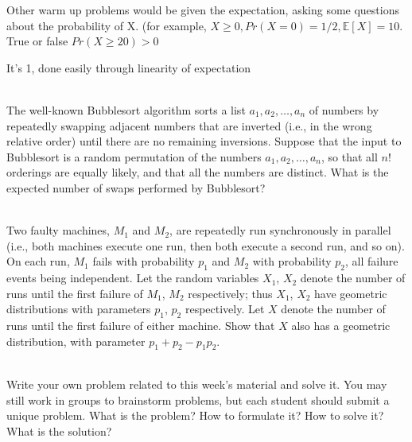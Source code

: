 \documentclass[]{article}
\begin{document}
\begin{qunlist}
 Other warm up problems would be given the expectation, asking some questions about the probability of X. (for example, $X\geq 0, Pr(X=0) = 1/2, \mathbb{E}[X] = 10.$ True or false $Pr(X \geq 20) > 0$



It's 1, done easily through linearity of expectation


 \\
The well-known Bubblesort algorithm sorts a list $a_1, a_2, \ldots, a_n$ of numbers by repeatedly swapping adjacent numbers that are inverted (i.e., in the wrong relative order) until there are no remaining inversions. Suppose that the input to Bubblesort is a random permutation of the numbers $a_1, a_2, \ldots, a_n$, so that all $n!$ orderings are equally likely, and that all the numbers are distinct. What is the expected number of swaps performed by Bubblesort?

 \\
Two faulty machines, $M_1$ and $M_2$, are repeatedly run synchronously in parallel (i.e., both machines execute one run, then both execute a second run, and so on). On each run, $M_1$ fails with probability $p_1$ and $M_2$ with probability $p_2$, all failure events being independent. Let the random variables $X_1$, $X_2$ denote the number of runs until the first failure of $M_1$, $M_2$ respectively; thus $X_1$, $X_2$ have geometric distributions with parameters $p_1$, $p_2$ respectively.
Let $X$ denote the number of runs until the first failure of either machine. Show that $X$ also has a geometric distribution, with parameter $p_1 + p_2 − p_1p_2.$


 \\
Write your own problem related to this week's material and solve it. You may still work in groups to brainstorm problems, but each student should submit a unique problem. What is the problem? How to formulate it? How to solve it? What is the solution?
    
\end{qunlist}
\end{document}
